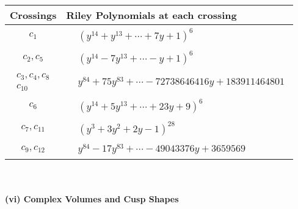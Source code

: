 \documentclass[1p]{elsarticle_modified}
\theoremstyle{definition}
\begin{document}
\begin{tabular}{m{50pt}|m{274pt}}
Crossings & \hspace{64pt}Riley Polynomials at each crossing \\
\hline $$\begin{aligned}c_{1}\end{aligned}$$&$\begin{aligned}
&(y^{14}+y^{13}+\cdots+7 y+1)^{6}
\end{aligned}$\\
\hline $$\begin{aligned}c_{2},c_{5}\end{aligned}$$&$\begin{aligned}
&(y^{14}-7 y^{13}+\cdots- y+1)^{6}
\end{aligned}$\\
\hline $$\begin{aligned}c_{3},c_{4},c_{8}\\c_{10}\end{aligned}$$&$\begin{aligned}
&y^{84}+75 y^{83}+\cdots-72738646416 y+183911464801
\end{aligned}$\\
\hline $$\begin{aligned}c_{6}\end{aligned}$$&$\begin{aligned}
&(y^{14}+5 y^{13}+\cdots+23 y+9)^{6}
\end{aligned}$\\
\hline $$\begin{aligned}c_{7},c_{11}\end{aligned}$$&$\begin{aligned}
&(y^3+3 y^2+2 y-1)^{28}
\end{aligned}$\\
\hline $$\begin{aligned}c_{9},c_{12}\end{aligned}$$&$\begin{aligned}
&y^{84}-17 y^{83}+\cdots-49043376 y+3659569
\end{aligned}$\\
\hline
\end{tabular}\\~\\
\newpage\flushleft \textbf{(vi) Complex Volumes and Cusp Shapes}
\end{document}
